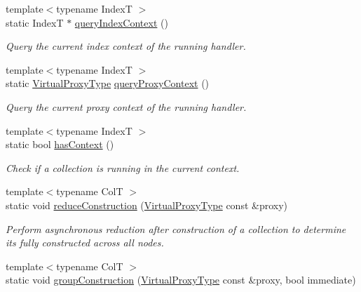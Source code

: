 \begin{DoxyCompactItemize}
{\footnotesize template$<$typename IndexT $>$ }\\static IndexT $\ast$ \hyperlink{structvt_1_1vrt_1_1collection_1_1_collection_manager_a5364a7039d323f3733b6ab1816cf61d4}{query\+Index\+Context} ()
\begin{DoxyCompactList}\small\item\em Query the current index context of the running handler. \end{DoxyCompactList}\item 
{\footnotesize template$<$typename IndexT $>$ }\\static \hyperlink{namespacevt_a1b417dd5d684f045bb58a0ede70045ac}{Virtual\+Proxy\+Type} \hyperlink{structvt_1_1vrt_1_1collection_1_1_collection_manager_a77d8832834659c44badf499c4770777b}{query\+Proxy\+Context} ()
\begin{DoxyCompactList}\small\item\em Query the current proxy context of the running handler. \end{DoxyCompactList}\item 
{\footnotesize template$<$typename IndexT $>$ }\\static bool \hyperlink{structvt_1_1vrt_1_1collection_1_1_collection_manager_ad94808d98e429e50376a9d1b35de57ee}{has\+Context} ()
\begin{DoxyCompactList}\small\item\em Check if a collection is running in the current context. \end{DoxyCompactList}\item 
{\footnotesize template$<$typename ColT $>$ }\\static void \hyperlink{structvt_1_1vrt_1_1collection_1_1_collection_manager_a387f6106adb3d0accd039ee4ff50a515}{reduce\+Construction} (\hyperlink{namespacevt_a1b417dd5d684f045bb58a0ede70045ac}{Virtual\+Proxy\+Type} const \&proxy)
\begin{DoxyCompactList}\small\item\em Perform asynchronous reduction after construction of a collection to determine it\textquotesingle{}s fully constructed across all nodes. \end{DoxyCompactList}\item 
{\footnotesize template$<$typename ColT $>$ }\\static void \hyperlink{structvt_1_1vrt_1_1collection_1_1_collection_manager_a3512b8e7d8bac218f28e7ffef611e5fa}{group\+Construction} (\hyperlink{namespacevt_a1b417dd5d684f045bb58a0ede70045ac}{Virtual\+Proxy\+Type} const \&proxy, bool immediate)

\end{DoxyCompactItemize}
